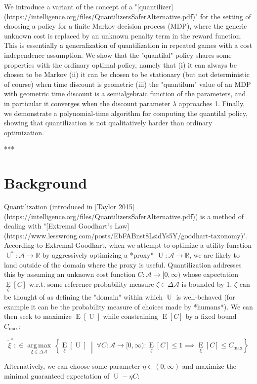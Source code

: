 \documentclass[a4paper]{article}
\newcommand{\AB}[1]{\left[#1\right]}
\newcommand{\ACM}[2]{\left\{#1\;\middle\vert\;#2\right\}}
\newcommand{\Ea}[2]{\underset{#1}{\operatorname{E}}\AB{#2}}
\newcommand{\Argmax}[1]{\underset{#1}{\operatorname{arg\,max}}\,}
\newcommand{\Reals}{\mathbb{R}}
\newcommand{\A}{\mathcal{A}}
\newcommand{\Ut}{\operatorname{U}}
\newcommand{\Co}{C}
\begin{document}
We introduce a variant of the concept of a "[quantilizer](https://intelligence.org/files/QuantilizersSaferAlternative.pdf)" for the setting of choosing a policy for a finite Markov decision process (MDP), where the generic unknown cost is replaced by an unknown penalty term in the reward function. This is essentially a generalization of quantilization in repeated games with a cost independence assumption. We show that the "quantilal" policy shares some properties with the ordinary optimal policy, namely that (i) it can always be chosen to be Markov (ii) it can be chosen to be stationary (but not deterministic of course) when time discount is geometric (iii) the "quantilum" value of an MDP with geometric time discount is a semialgebraic function of the parameters, and in particular it converges when the discount parameter $\lambda$ approaches 1. Finally, we demonstrate a polynomial-time algorithm for computing the quantilal policy, showing that quantilization is not qualitatively harder than ordinary optimization.

***

\section{Background}

Quantilization (introduced in [Taylor 2015](https://intelligence.org/files/QuantilizersSaferAlternative.pdf)) is a method of dealing with "[Extremal Goodhart's Law](https://www.lesswrong.com/posts/EbFABnst8LsidYs5Y/goodhart-taxonomy)". According to Extremal Goodhart, when we attempt to optimize a utility function $\Ut^*: \A \rightarrow \Reals$ by aggressively optimizing a *proxy* $\Ut: \A \rightarrow \Reals$, we are likely to land outside of the domain where the proxy is useful. Quantilization addresses this by assuming an unknown cost function $\Co: \A \rightarrow [0,\infty)$ whose expectation $\Ea{\zeta}{\Co}$ w.r.t. some reference probability measure $\zeta \in \Delta\A$ is bounded by 1. $\zeta$ can be thought of as defining the "domain" within which $\Ut$ is well-behaved (for example it can be the probability measure of choices made by *humans*). We can then seek to maximize $\Ea{}{\Ut}$ while constraining $\Ea{}{\Co}$ by a fixed bound $C_{\max}$:

$$\tilde{\xi}^* :\in \Argmax{\xi \in \Delta\A}\ACM{\Ea{\xi}{\Ut}}{\forall \Co: \A \rightarrow [0,\infty): \Ea{\zeta}{\Co} \leq 1 \implies \Ea{\xi}{\Co} \leq C_{\max}}$$

Alternatively, we can choose some parameter $\eta\in(0,\infty)$ and maximize the minimal guaranteed expectation of $\Ut-\eta \Co$:
\end{document}
